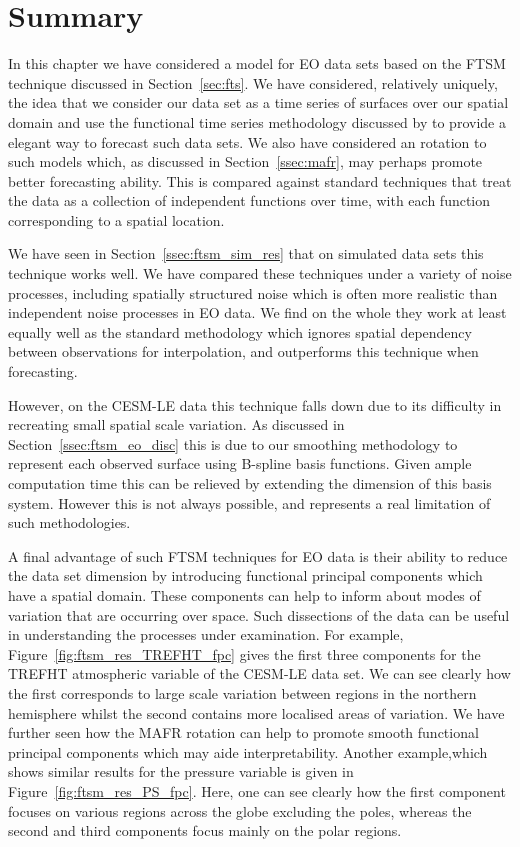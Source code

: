\section{Summary \label{sec:ftsm_summary}}
In this chapter we have considered a model for EO data sets based on the FTSM technique discussed in Section~\ref{sec:fts}.
We have considered, relatively uniquely, the idea that we consider our data set as a time series of surfaces over our spatial domain and use the functional time series methodology discussed by \citep{hyndman_forecasting_2009} to provide a elegant way to forecast such data sets.
We also have considered an rotation to such models which, as discussed in Section~\ref{ssec:mafr}, may perhaps promote better forecasting ability.
This is compared against standard techniques that treat the data as a collection of independent functions over time, with each function corresponding to a spatial location. 


We have seen in Section~\ref{ssec:ftsm_sim_res} that on simulated data sets this technique works well.
We have compared these techniques under a variety of noise processes, including spatially structured noise which is often more realistic than independent noise processes in EO data.
We find on the whole they work at least equally well as the standard methodology which ignores spatial dependency between observations for interpolation, and outperforms this technique when forecasting.

However, on the CESM-LE data this technique falls down due to its difficulty in recreating small spatial scale variation.
As discussed in Section~\ref{ssec:ftsm_eo_disc} this is due to our smoothing methodology to represent each observed surface using B-spline basis functions.
Given ample computation time this can be relieved by extending the dimension of this basis system.
However this is not always possible, and represents a real limitation of such methodologies.

A final advantage of such FTSM techniques for EO data is their ability to reduce the data set dimension by introducing functional principal components which have a spatial domain.
These components can help to inform about modes of variation that are occurring over space.
Such dissections of the data can be useful in understanding the processes under examination. 
For example, Figure~\ref{fig:ftsm_res_TREFHT_fpc} gives the first three components for the TREFHT atmospheric variable of the CESM-LE data set.
We can see clearly how the first corresponds to large scale variation between regions in the northern hemisphere whilst the second contains more localised areas of variation. 
We have further seen how the MAFR rotation can help to promote smooth functional principal components which may aide interpretability. 
Another example,which shows similar results for the pressure variable is given in Figure~\ref{fig:ftsm_res_PS_fpc}.
Here, one can see clearly how the first component focuses on various regions across the globe excluding the poles, whereas the second and third components focus mainly on the polar regions.


